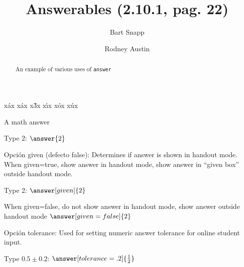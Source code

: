 \documentclass{ximera}
\title[Examples:]{Answerables (2.10.1, pag. 22)}
\author{Bart Snapp \and Rodney Austin}
\begin{document}
\begin{abstract}
  An example of various uses of \texttt{answer}
\end{abstract}
\maketitle

x\'ax x\'{a}x x\'{3}x x\'{\i}x x\'{o}x x\'{u}x

A math answer

Type $2$: $\answer{2}$

Opci{\'{o}}n  {\ttfamily given} (defecto false): Determines if answer is shown in handout mode. 
When given=true, show answer in handout mode, show answer in ``given box'' outside handout mode. 

Type 2: $\answer[given]{2}$

When given=false, do not show answer in handout mode, show answer outside handout mode  
$\answer[given=false]{2}$

Opci\'{o}n {\ttfamily tolerance}: Used for setting numeric answer tolerance for online student input.

Type $0.5\pm 0.2$: $\answer[tolerance=.2]{\frac{1}{2}}$
\end{document}
